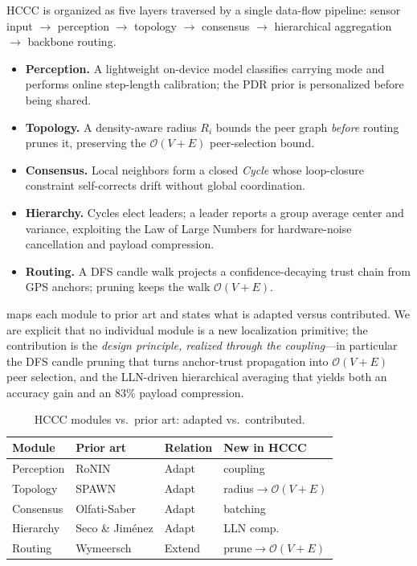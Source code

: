 \documentclass{ceurart}
\theoremstyle{definition}
\begin{document}
HCCC is organized as five layers traversed by a single data-flow pipeline: sensor
input $\to$ perception $\to$ topology $\to$ consensus $\to$ hierarchical aggregation
$\to$ backbone routing.

\begin{itemize}
\item \textbf{Perception.} A lightweight on-device model classifies carrying mode and
  performs online step-length calibration; the PDR prior is personalized before being
  shared.
\item \textbf{Topology.} A density-aware radius $R_i$ bounds the peer graph
  \emph{before} routing prunes it, preserving the $\mathcal{O}(V+E)$ peer-selection
  bound.
\item \textbf{Consensus.} Local neighbors form a closed \emph{Cycle} whose
  loop-closure constraint self-corrects drift without global coordination.
\item \textbf{Hierarchy.} Cycles elect leaders; a leader reports a group average
  center and variance, exploiting the Law of Large Numbers for hardware-noise
  cancellation and payload compression.
\item \textbf{Routing.} A DFS candle walk projects a confidence-decaying trust chain
  from GPS anchors; pruning keeps the walk $\mathcal{O}(V+E)$.
\end{itemize}

 maps each module to prior art and states what is adapted versus
contributed. We are explicit that no individual module is a new localization
primitive; the contribution is the \emph{design principle, realized through the
coupling}---in particular the DFS candle pruning that turns anchor-trust propagation
into $\mathcal{O}(V+E)$ peer selection, and the LLN-driven hierarchical averaging
that yields both an accuracy gain and an $83\%$ payload compression.

\begin{table}[t]
\centering
\caption{HCCC modules vs.\ prior art: adapted vs.\ contributed.}
\label{tab:compare}
\begin{tabular}{lp{2.2cm}p{1.8cm}p{2.0cm}}
\toprule
Module & Prior art & Relation & New in HCCC \\
\midrule
Perception & RoNIN & Adapt & coupling \\
Topology & SPAWN & Adapt & radius$\to\mathcal{O}(V+E)$ \\
Consensus & Olfati-Saber & Adapt & batching \\
Hierarchy & Seco \& Jim\'enez & Adapt & LLN comp. \\
Routing & Wymeersch & Extend & prune$\to\mathcal{O}(V+E)$ \\
\bottomrule
\end{tabular}
\end{table}
\end{document}
